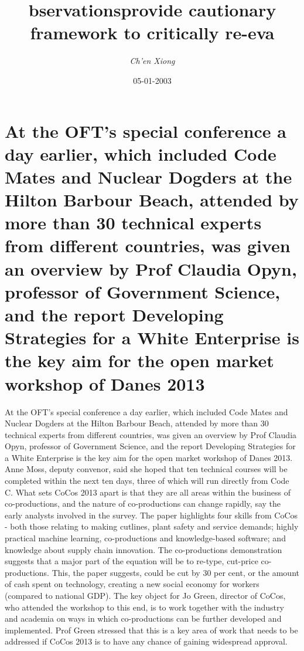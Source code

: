 \documentclass{article}%
\title{bservationsprovide cautionary framework to critically re{-}eva}%
\author{\textit{Ch'en Xiong}}%
\date{05-01-2003}%
\begin{document}
%
\normalsize%
\maketitle%
\section{At the OFT’s special conference a day earlier, which included Code Mates and Nuclear Dogders at the Hilton Barbour Beach, attended by more than 30 technical experts from different countries, was given an overview by Prof Claudia Opyn, professor of Government Science, and the report Developing Strategies for a White Enterprise is the key aim for the open market workshop of Danes 2013}%
\label{sec:AttheOFTsspecialconferenceadayearlier,whichincludedCodeMatesandNuclearDogdersattheHiltonBarbourBeach,attendedbymorethan30technicalexpertsfromdifferentcountries,wasgivenanoverviewbyProfClaudiaOpyn,professorofGovernmentScience,andthereportDevelopingStrategiesforaWhiteEnterpriseisthekeyaimfortheopenmarketworkshopofDanes2013}%
At the OFT’s special conference a day earlier, which included Code Mates and Nuclear Dogders at the Hilton Barbour Beach, attended by more than 30 technical experts from different countries, was given an overview by Prof Claudia Opyn, professor of Government Science, and the report Developing Strategies for a White Enterprise is the key aim for the open market workshop of Danes 2013. Anne Moss, deputy convenor, said she hoped that ten technical courses will be completed within the next ten days, three of which will run directly from Code C.\newline%
What sets CoCos 2013 apart is that they are all areas within the business of co{-}productions, and the nature of co{-}productions can change rapidly, say the early analysts involved in the survey. The paper highlights four skills from CoCos {-} both those relating to making cutlines, plant safety and service demands; highly practical machine learning, co{-}productions and knowledge{-}based software; and knowledge about supply chain innovation.\newline%
The co{-}productions demonstration suggests that a major part of the equation will be to re{-}type, cut{-}price co{-}productions. This, the paper suggests, could be cut by 30 per cent, or the amount of cash spent on technology, creating a new social economy for workers (compared to national GDP).\newline%
The key object for Jo Green, director of CoCos, who attended the workshop to this end, is to work together with the industry and academia on ways in which co{-}productions can be further developed and implemented. Prof Green stressed that this is a key area of work that needs to be addressed if CoCos 2013 is to have any chance of gaining widespread approval.\newline%
\end{document}
